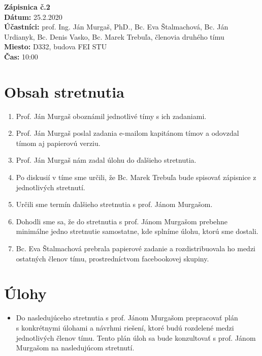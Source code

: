
\usepackage{parskip}%

	\textbf{{\Huge Zápisnica č.2}}\\
			
	\textbf{Dátum:} 25.2.2020\\	
		
	\textbf{Účastníci:} prof. Ing. Ján Murgaš, PhD., Bc. Eva Štalmachová, Bc. Ján Urdianyk, Bc. Denis Vasko, Bc. Marek Trebuľa, členovia druhého tímu\\
		
	\textbf{Miesto:} D332, budova FEI STU\\	
	
	\textbf{Čas:} 10:00    
    \section*{Obsah stretnutia}
    \begin{enumerate}
    	\item Prof. Ján Murgaš oboznámil jednotlivé tímy s ich zadaniami.
    	\item Prof. Ján Murgaš poslal zadania e-mailom kapitánom tímov a odovzdal\\ tímom aj papierovú verziu.
    	\item Prof. Ján Murgaš nám zadal úlohu do ďalšieho stretnutia.
    	\item Po diskusií v tíme sme určili, že Bc. Marek Trebuľa bude spisovať zápisnice z jednotlivých stretnutí.
    	\item Určili sme termín ďalšieho stretnutia s prof. Jánom Murgašom.
    	\item Dohodli sme sa, že do stretnutia s prof. Jánom Murgašom prebehne\\ minimálne jedno stretnutie samostatne, kde splníme úlohu, ktorú sme dostali.
    	\item Bc. Eva Štalmachová prebrala papierové zadanie a rozdistribuovala ho medzi ostatných členov tímu, prostredníctvom facebookovej skupiny.
    	
    \end{enumerate}    
    \section*{Úlohy}
    \begin{itemize}
    	\item Do nasledujúceho stretnutia s prof. Jánom Murgašom prepracovať plán\\ s konkrétnymi úlohami a návrhmi riešení, ktoré budú rozdelené medzi\\ jednotlivých členov tímu. Tento plán úloh sa bude konzultovať s prof. Jánom Murgašom na nasledujúcom stretnutí.
    \end{itemize}

